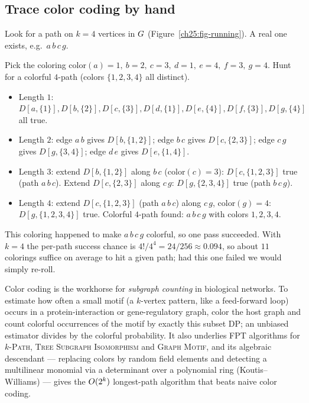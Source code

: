 \subsection{Trace color coding by hand}

Look for a path on $k=4$ vertices in $G$ (Figure~\ref{ch25:fig-running}). A real one exists, e.g.\ $a\,b\,c\,g$.

\begin{labbox}
Pick the coloring $\mathrm{color}(a)=1,\ b=2,\ c=3,\ d=1,\ e=4,\ f=3,\ g=4$. Hunt for a colorful $4$-path (colors $\{1,2,3,4\}$ all distinct).
\begin{itemize}
  \item Length $1$: $D[a,\{1\}],D[b,\{2\}],D[c,\{3\}],D[d,\{1\}],D[e,\{4\}],D[f,\{3\}],D[g,\{4\}]$ all true.
  \item Length $2$: edge $a\,b$ gives $D[b,\{1,2\}]$; edge $b\,c$ gives $D[c,\{2,3\}]$; edge $c\,g$ gives $D[g,\{3,4\}]$; edge $d\,e$ gives $D[e,\{1,4\}]$.
  \item Length $3$: extend $D[b,\{1,2\}]$ along $b\,c$ ($\mathrm{color}(c)=3$): $D[c,\{1,2,3\}]$ true (path $a\,b\,c$). Extend $D[c,\{2,3\}]$ along $c\,g$: $D[g,\{2,3,4\}]$ true (path $b\,c\,g$).
  \item Length $4$: extend $D[c,\{1,2,3\}]$ (path $a\,b\,c$) along $c\,g$, $\mathrm{color}(g)=4$: $D[g,\{1,2,3,4\}]$ true. Colorful $4$-path found: $a\,b\,c\,g$ with colors $1,2,3,4$.
\end{itemize}
This coloring happened to make $a\,b\,c\,g$ colorful, so one pass succeeded. With $k=4$ the per-path success chance is $4!/4^4 = 24/256 \approx 0.094$, so about $11$ colorings suffice on average to hit a given path; had this one failed we would simply re-roll.
\end{labbox}

\begin{applicationbox}
Color coding is the workhorse for \emph{subgraph counting} in biological networks. To estimate how often a small motif (a $k$-vertex pattern, like a feed-forward loop) occurs in a protein-interaction or gene-regulatory graph, color the host graph and count colorful occurrences of the motif by exactly this subset DP; an unbiased estimator divides by the colorful probability. It also underlies FPT algorithms for \textsc{$k$-Path}, \textsc{Tree Subgraph Isomorphism} and \textsc{Graph Motif}, and its algebraic descendant --- replacing colors by random field elements and detecting a multilinear monomial via a determinant over a polynomial ring (Koutis--Williams) --- gives the $O(2^k)$ longest-path algorithm that beats naive color coding.
\end{applicationbox}


